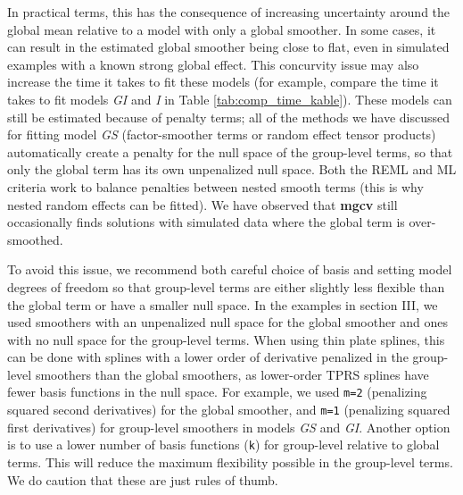 \documentclass[12pt]{article}
\begin{document}
In practical terms, this has the consequence of increasing uncertainty
around the global mean relative to a model with only a global smoother.
In some cases, it can result in the estimated global smoother being
close to flat, even in simulated examples with a known strong global
effect. This concurvity issue may also increase the time it takes to fit
these models (for example, compare the time it takes to fit models
\emph{GI} and \emph{I} in Table \ref{tab:comp_time_kable}). These models
can still be estimated because of penalty terms; all of the methods we
have discussed for fitting model \emph{GS} (factor-smoother terms or
random effect tensor products) automatically create a penalty for the
null space of the group-level terms, so that only the global term has
its own unpenalized null space. Both the REML and ML criteria work to
balance penalties between nested smooth terms (this is why nested random
effects can be fitted). We have observed that \textbf{mgcv} still
occasionally finds solutions with simulated data where the global term
is over-smoothed.

To avoid this issue, we recommend both careful choice of basis and
setting model degrees of freedom so that group-level terms are either
slightly less flexible than the global term or have a smaller null
space. In the examples in section III, we used smoothers with an
unpenalized null space for the global smoother and ones with no null
space for the group-level terms. When using thin plate splines, this can
be done with splines with a lower order of derivative penalized in the
group-level smoothers than the global smoothers, as lower-order TPRS
splines have fewer basis functions in the null space. For example, we
used \texttt{m=2} (penalizing squared second derivatives) for the global
smoother, and \texttt{m=1} (penalizing squared first derivatives) for
group-level smoothers in models \emph{GS} and \emph{GI}. Another option
is to use a lower number of basis functions (\texttt{k}) for group-level
relative to global terms. This will reduce the maximum flexibility
possible in the group-level terms. We do caution that these are just
rules of thumb.
\end{document}
